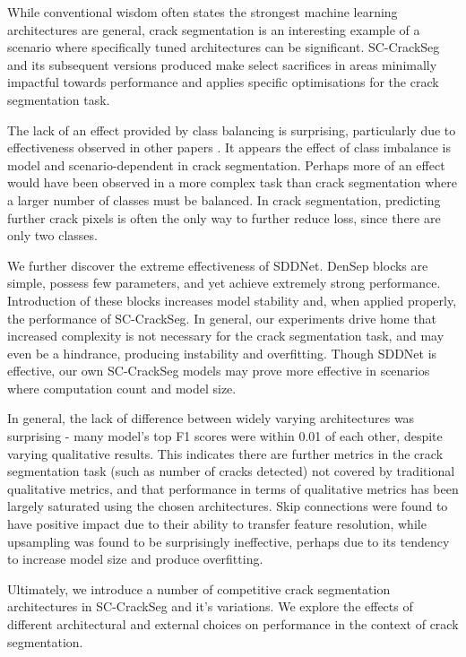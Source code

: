 \documentclass[a4paper,12pt]{report}
\begin{document}
While conventional wisdom often states the strongest machine learning architectures are general, crack segmentation is an interesting example of a scenario where specifically tuned architectures can be significant. SC-CrackSeg and its subsequent versions produced make select sacrifices in areas minimally impactful towards performance and applies specific optimisations for the crack segmentation task.

The lack of an effect provided by class balancing is surprising, particularly due to effectiveness observed in other papers \cite{liu_deepcrack_2019}. It appears the effect of class imbalance is model and scenario-dependent in crack segmentation. Perhaps more of an effect would have been observed in a more complex task than crack segmentation where a larger number of classes must be balanced. In crack segmentation, predicting further crack pixels is often the only way to further reduce loss, since there are only two classes.

We further discover the extreme effectiveness of SDDNet. DenSep blocks are simple, possess few parameters, and yet achieve extremely strong performance. Introduction of these blocks increases model stability and, when applied properly, the performance of SC-CrackSeg. In general, our experiments drive home that increased complexity is not necessary for the crack segmentation task, and may even be a hindrance, producing instability and overfitting. Though SDDNet is effective, our own SC-CrackSeg models may prove more effective in scenarios where computation count and model size.

In general, the lack of difference between widely varying architectures was surprising - many model's top F1 scores were within 0.01 of each other, despite varying qualitative results. This indicates there are further metrics in the crack segmentation task (such as number of cracks detected) not covered by traditional qualitative metrics, and that performance in terms of qualitative metrics has been largely saturated using the chosen architectures. Skip connections were found to have positive impact due to their ability to transfer feature resolution, while upsampling was found to be surprisingly ineffective, perhaps due to its tendency to increase model size and produce overfitting.

Ultimately, we introduce a number of competitive crack segmentation architectures in SC-CrackSeg and it's variations. We explore the effects of different architectural and external choices on performance in the context of crack segmentation.
\end{document}
